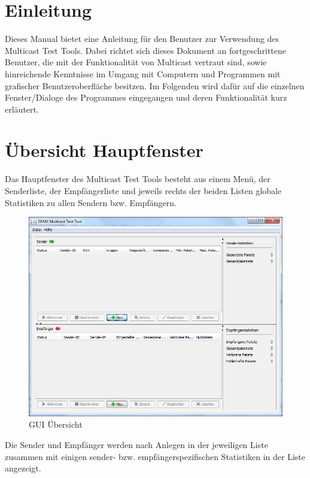 \chapter{Einleitung}
Dieses Manual bietet eine Anleitung für den Benutzer zur Verwendung des
Multicast Test Tools. Dabei richtet sich dieses Dokument an fortgeschrittene
Benutzer, die mit der Funktionalität von Multicast vertraut sind, sowie
hinreichende Kenntnisse im Umgang mit Computern und Programmen mit
grafischer Benutzeroberfläche besitzen. Im Folgenden wird dafür auf die
einzelnen Fenster/Dialoge des Programmes eingegangen und deren Funktionalität kurz erläutert.
  
\chapter{Übersicht Hauptfenster}

Das Hauptfenster des Multicast Test Tools besteht aus einem Menü, der
Senderliste, der Empfängerliste und jeweils rechts der beiden Listen globale
Statistiken zu allen Sendern bzw. Empfängern.

\begin{figure}[htbp]
\begin{center}
\includegraphics[width=14cm]{images/mainFrameBasic.png}
\caption[GUI Übersicht]{GUI Übersicht}
\label{overview}
\end{center}
\end{figure}

Die Sender und Empfänger werden nach Anlegen in der jeweiligen Liste zusammen
mit einigen sender- bzw. empfängerspezifischen Statistiken in der Liste
angezeigt.

